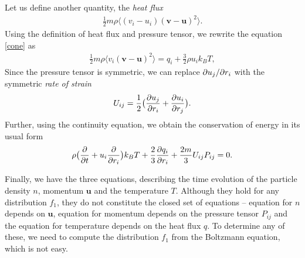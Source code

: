 Let us define another quantity, the \textit{heat flux}
\begin{align*}
\frac{1}{2} m \rho \langle (v_i - u_i)(\bm{v} - \bm{u})^2 \rangle.
\end{align*}
Using the definition of heat flux and pressure tensor, we rewrite the equation \ref{cone} as
\begin{align*}
\frac{1}{2}m \rho \langle v_i (\bm{v} - \bm{u})^2 \rangle = q_i + \frac{3}{2}\rho u_ik_B T,
\end{align*}
Since the pressure tensor is symmetric, we can replace $\partial u_j / \partial r_i$ with the symmetric \textit{rate of strain}
\begin{align*}
U_{ij} = \frac{1}{2}\big( \frac{\partial u_j}{\partial r_i} + \frac{\partial u_i}{\partial r_j} \big).
\end{align*}
Further, using the continuity equation, we obtain the conservation of energy in its usual form
\begin{align*}
\rho \big( \frac{\partial}{\partial t} + u_i \frac{\partial}{\partial r_i} \big) k_B T + \frac{2}{3} \frac{\partial q_i}{\partial r_i} + \frac{2m}{3} U_{ij} P_{ij} = 0.
\end{align*}

Finally, we have the three equations, describing the time evolution of the particle density $n$, momentum $\bm{u}$ and the temperature $T$.
Although they hold for any distribution $f_1$, they do not constitute the closed set of equations -- equation for $n$ depends on $\bm{u}$, equation for momentum depends on the pressure tensor $P_{ij}$ and the equation for temperature depends on the heat flux $q$. To determine any of these, we need to compute the distribution $f_1$ from the Boltzmann equation, which is not easy.

